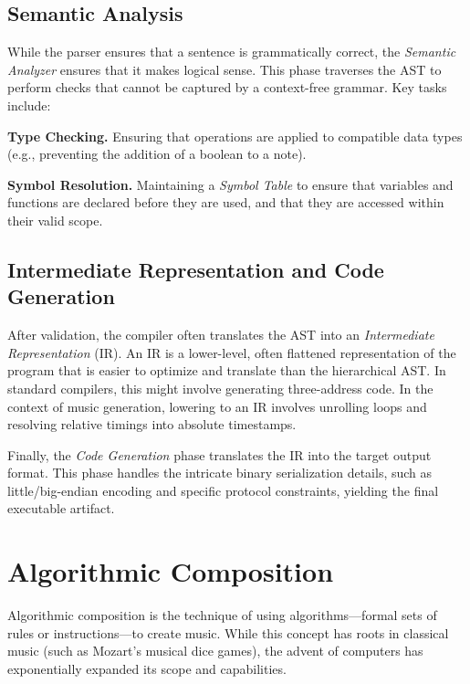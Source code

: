 \subsection{Semantic Analysis}\label{detail-subsec:semantic-analysis}

While the parser ensures that a sentence is grammatically correct, the \textit{Semantic Analyzer} ensures that it makes
logical sense.
This phase traverses the AST to perform checks that cannot be captured by a context-free grammar.
Key tasks include:

\noindent \textbf{Type Checking.} Ensuring that operations are applied to compatible data types (e.g., preventing the
addition of a boolean to a note).

\noindent \textbf{Symbol Resolution.} Maintaining a \textit{Symbol Table} to ensure that variables and functions are
declared before they are used, and that they are accessed within their valid scope.

\subsection{Intermediate Representation and Code
Generation}\label{detail-subsec:intermediate-representation-and-code-generation}

After validation, the compiler often translates the AST into an \textit{Intermediate Representation} (IR).
An IR is a lower-level, often flattened representation of the program that is easier to optimize and translate than the
hierarchical AST\@.
In standard compilers, this might involve generating three-address code.
In the context of music generation, lowering to an IR involves unrolling loops and resolving relative timings into
absolute timestamps.

Finally, the \textit{Code Generation} phase translates the IR into the target output format.
This phase handles the intricate binary serialization details, such as little/big-endian encoding and specific protocol
constraints, yielding the final executable artifact.


\section{Algorithmic Composition}\label{detail-sec:background-algorithmic-composition}

Algorithmic composition is the technique of using algorithms---formal sets of rules or instructions---to create music.
While this concept has roots in classical music (such as Mozart's musical dice games), the advent of computers has
exponentially expanded its scope and capabilities.

